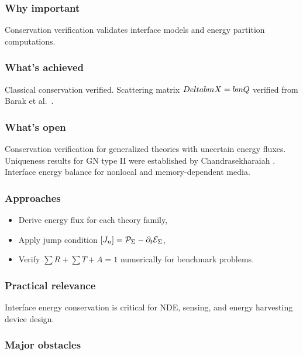 \subsubsection{Why important}

Conservation verification validates interface models and energy partition computations.

\subsubsection{What's achieved}

Classical conservation verified. Scattering matrix $\\Delta\\bm{X}=\\bm{Q}$ verified from Barak et al.~\cite{Barak2023}.

\subsubsection{What's open}

Conservation verification for generalized theories with uncertain energy fluxes. Uniqueness results for GN type II were established by Chandrasekharaiah \cite{Chandrasekharaiah1996}. Interface energy balance for nonlocal and memory-dependent media.

\subsubsection{Approaches}

\begin{itemize}
\item Derive energy flux for each theory family,
\item Apply jump condition $\left[ J_n \right] = \mathcal{P}_\Sigma - \partial_t\mathcal{E}_\Sigma$,
\item Verify $\sum R + \sum T + A = 1$ numerically for benchmark problems.
\end{itemize}

\subsubsection{Practical relevance}

Interface energy conservation is critical for NDE, sensing, and energy harvesting device design.

\subsubsection{Major obstacles}

